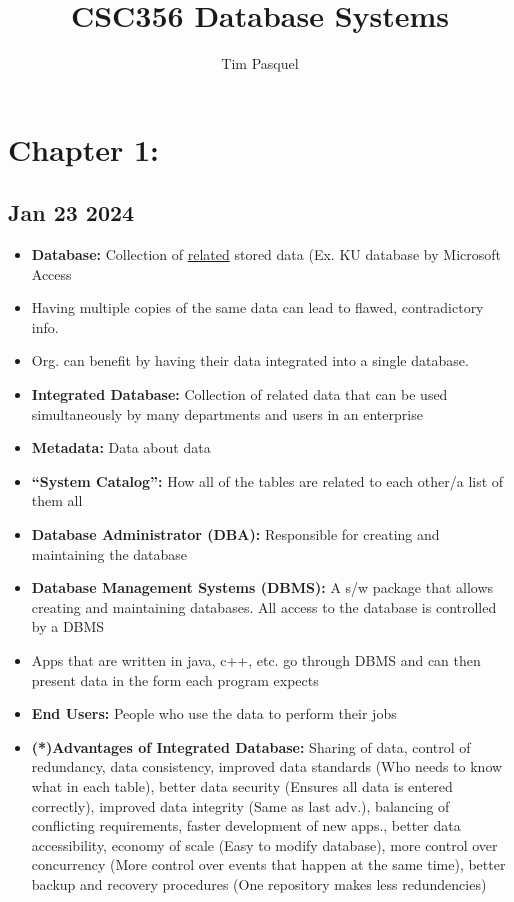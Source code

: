 \documentclass[12pt]{article}
\author{Tim Pasquel}
\title{CSC356 Database Systems}
\begin{document}
\maketitle

\titlepage

\section{Chapter 1:}

\subsection{Jan 23 2024}

\begin{itemize}
		  \item \textbf{Database:} Collection of \underline{related} stored data (Ex. KU database by Microsoft Access
		  \item Having multiple copies of the same data can lead to flawed, contradictory info. 
		  \item Org. can benefit by having their data integrated into a single database.
		  \item \textbf{Integrated Database:} Collection of related data that can be used simultaneously by many departments and users in an enterprise
		  \item \textbf{Metadata:} Data about data
		  \item \textbf{``System Catalog'':} How all of the tables are related to each other/a list of them all
		  \item \textbf{Database Administrator (DBA):} Responsible for creating and maintaining the database
		  \item \textbf{Database Management Systems (DBMS):} A s/w package that allows creating and maintaining databases. All access to the database is controlled by a DBMS
		  \item Apps that are written in java, c++, etc. go through DBMS and can then present data in the 
					 form each program expects 
		  \item \textbf{End Users:} People who use the data to perform their jobs
		  \item \textbf{(*)Advantages of Integrated Database:} Sharing of data, control of redundancy, data consistency, improved data standards (Who needs to know what in each table), better data security (Ensures all data is entered correctly), improved data integrity (Same as last adv.), balancing of conflicting requirements, faster development of new apps., better data accessibility, economy of scale (Easy to modify database), more control over concurrency (More control over events that happen at the same time), better backup and recovery procedures (One repository makes less redundencies)
\end{itemize}
\end{document}
